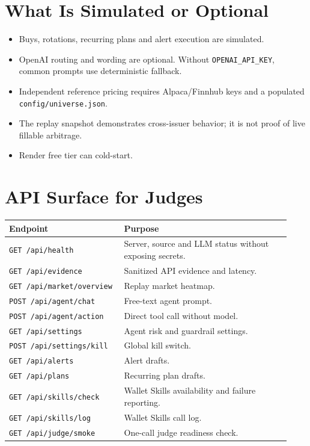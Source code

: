 \documentclass[11pt,a4paper]{article}
\begin{document}
\section{What Is Simulated or Optional}

\begin{itemize}
  \item Buys, rotations, recurring plans and alert execution are simulated.
  \item OpenAI routing and wording are optional. Without \texttt{OPENAI\_API\_KEY}, common prompts use deterministic fallback.
  \item Independent reference pricing requires Alpaca/Finnhub keys and a populated \texttt{config/universe.json}.
  \item The replay snapshot demonstrates cross-issuer behavior; it is not proof of live fillable arbitrage.
  \item Render free tier can cold-start.
\end{itemize}

\section{API Surface for Judges}

\begin{longtable}{p{0.38\linewidth}p{0.55\linewidth}}
\textbf{Endpoint} & \textbf{Purpose} \\
\hline
\texttt{GET /api/health} & Server, source and LLM status without exposing secrets. \\
\texttt{GET /api/evidence} & Sanitized API evidence and latency. \\
\texttt{GET /api/market/overview} & Replay market heatmap. \\
\texttt{POST /api/agent/chat} & Free-text agent prompt. \\
\texttt{POST /api/agent/action} & Direct tool call without model. \\
\texttt{GET /api/settings} & Agent risk and guardrail settings. \\
\texttt{POST /api/settings/kill} & Global kill switch. \\
\texttt{GET /api/alerts} & Alert drafts. \\
\texttt{GET /api/plans} & Recurring plan drafts. \\
\texttt{GET /api/skills/check} & Wallet Skills availability and failure reporting. \\
\texttt{GET /api/skills/log} & Wallet Skills call log. \\
\texttt{GET /api/judge/smoke} & One-call judge readiness check. \\
\end{longtable}
\end{document}
